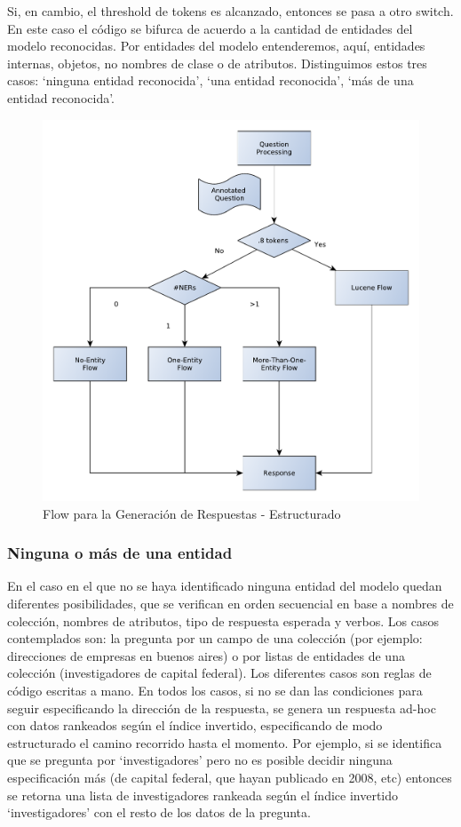 Si, en cambio, el threshold de tokens es alcanzado, entonces se pasa a otro switch. En este caso el código se bifurca de acuerdo a la cantidad de entidades del modelo reconocidas. Por entidades del modelo entenderemos, aquí, entidades internas, objetos, no nombres de clase o de atributos. Distinguimos estos tres casos: `ninguna entidad reconocida', `una entidad reconocida', `más de una entidad reconocida'.



\begin{figure}[H]
  \centering
    \includegraphics[scale=0.5]{graficos/AnswerRetrievalFlowEstructurado}
  \caption{Flow para la Generación de Respuestas - Estructurado}
  \label{fig:AnswerRetrievalFlowEstructurado}
\end{figure}

\subsubsection*{Ninguna o más de una entidad}
En el caso en el que no se haya identificado ninguna entidad del modelo quedan diferentes posibilidades, que se verifican en orden secuencial en base a nombres de colección, nombres de atributos, tipo de respuesta esperada y verbos. Los casos contemplados son: la pregunta por un campo de una colección (por ejemplo: direcciones de empresas en buenos aires) o por listas de entidades de una colección (investigadores de capital federal). Los diferentes casos son reglas de código escritas a mano. En todos los casos, si no se dan las condiciones para seguir especificando la dirección de la respuesta, se genera un respuesta ad-hoc con datos rankeados según el índice invertido, especificando de modo estructurado el camino recorrido hasta el momento. Por ejemplo, si se identifica que se pregunta por `investigadores' pero no es posible decidir ninguna especificación más (de capital federal, que hayan publicado en 2008, etc) entonces se retorna una lista de investigadores rankeada según el índice invertido `investigadores' con el resto de los datos de la pregunta. 

